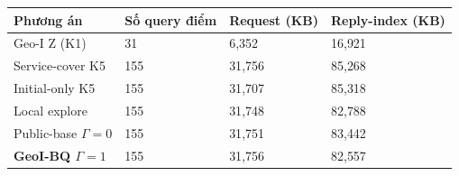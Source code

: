 \par\smallskip\noindent\begin{tabularx}{\linewidth}{@{}P{4.4cm}XXX@{}}\toprule
\textbf{Phương án} & \textbf{Số query điểm} & \textbf{Request (KB)} & \textbf{Reply-index (KB)} \\
\midrule
Geo-I Z (K1) & 31 & 6{,}352 & 16{,}921 \\
Service-cover K5 & 155 & 31{,}756 & 85{,}268 \\
Initial-only K5 & 155 & 31{,}707 & 85{,}318 \\
Local explore & 155 & 31{,}748 & 82{,}788 \\
Public-base $\Gamma=0$ & 155 & 31{,}751 & 83{,}442 \\
\textbf{GeoI-BQ $\Gamma=1$} & 155 & 31{,}756 & 82{,}557 \\
\bottomrule\end{tabularx}\par\smallskip
